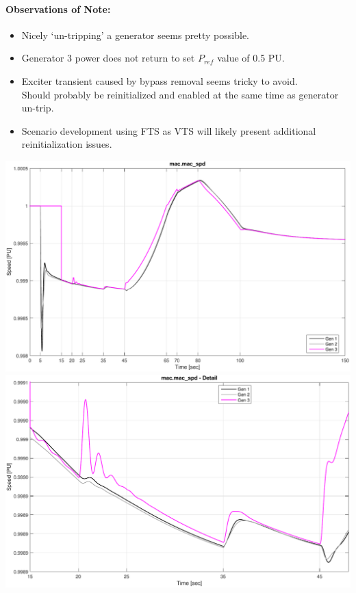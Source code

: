 \documentclass[12pt]{article}
\begin{document}
\paragraph{Observations of Note:}
\begin{itemize}
\item Nicely `un-tripping' a generator seems pretty possible.
\item Generator 3 power does not return to set $P_{ref}$ value of 0.5 PU.
\item Exciter transient caused by bypass removal seems tricky to avoid.\\
Should probably be reinitialized and enabled at the same time as generator un-trip.
\item Scenario development using FTS as VTS will likely present additional reinitialization issues.
\end{itemize}

\pagebreak
\includegraphics[width=\linewidth]{distinctSpeed}
\includegraphics[width=\linewidth]{distinctSpeedDetail}
\end{document}
